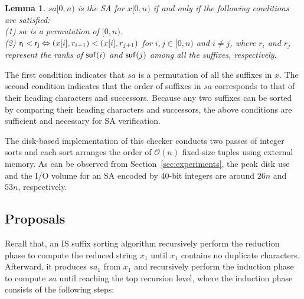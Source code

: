 \documentclass[10pt,journal,compsoc]{IEEEtran}
\newtheorem{lemma}[theorem]{Lemma}
\begin{document}
\begin{lemma} \label{lemma:1}
	$sa[0, n)$ is the SA for $x[0, n)$ if and only if the following conditions are satisfied:\\
	(1) $sa$ is a permutation of $[0, n)$. \\	
	(2) ${\sf r_i < r_j} \Leftrightarrow (x[i], r_{i + 1}) < (x[i], r_{j + 1})$ for $ i, j \in [0, n)$ and $i\ne j$, where $r_i$ and $r_j$ represent the ranks of ${\sf suf}(i)$ and ${\sf suf}(j)$ among all the suffixes, respectively. \\
\end{lemma}

\begin{IEEEproof}The first condition indicates that $sa$ is a permutation of all the suffixes in $x$. The second condition indicates that the order of suffixes in $sa$ corresponds to that of their heading characters and successors. Because any two suffixes can be sorted by comparing their heading characters and successors, the above conditions are sufficient and necessary for SA verification.

\end{IEEEproof}

The disk-based implementation of this checker conducts two passes of integer sorts and each sort arranges the order of $\mathcal{O}(n)$ fixed-size tuples using external memory. As can be observed from Section~\ref{sec:experiments}, the peak disk use and the I/O volume for an SA encoded by 40-bit integers are around $26n$ and $53n$, respectively.

\subsection{Proposals} \label{sec:checkers:proposals}

Recall that, an IS suffix sorting algorithm recursively perform the reduction phase to compute the reduced string $x_1$ until $x_1$ contains no duplicate characters. Afterward, it produces $sa_1$ from $x_1$ and recursively perform the induction phase to compute $sa$ until reaching the top recursion level, where the induction phase consists of the following steps:
\end{document}
